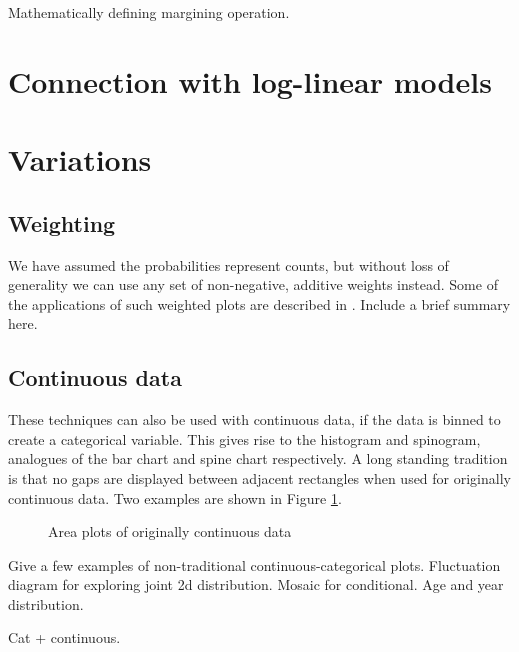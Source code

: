 \documentclass[letterpaper,oneside]{scrartcl}
\begin{document}
Mathematically defining margining operation.


\section{Connection with log-linear models}


\section{Variations}
\label{sec:variations}

% 


\subsection{Weighting}
\label{sub:weighting}

We have assumed the probabilities represent counts, but without loss of generality we can use any set of non-negative, additive weights instead.  Some of the applications of such weighted plots are described in \citet{unwin:2007}.  Include a brief summary here.

\subsection{Continuous data}
\label{sub:continuous_data}

These techniques can also be used with continuous data, if the data is binned to create a categorical variable. This gives rise to the histogram and spinogram, analogues of the bar chart and spine chart respectively. A long standing tradition is that no gaps are displayed between adjacent rectangles when used for originally continuous data. Two examples are shown in Figure \ref{fig:cont-examples}.

\begin{figure}[htbp]
  \begin{center}
  \end{center}
  \caption{Area plots of originally continuous data}
  \label{fig:cont-examples}
\end{figure}

Give a few examples of non-traditional continuous-categorical plots.  Fluctuation diagram for exploring joint 2d distribution.  Mosaic for conditional.  Age and year distribution.  

Cat + continuous.
\end{document}
